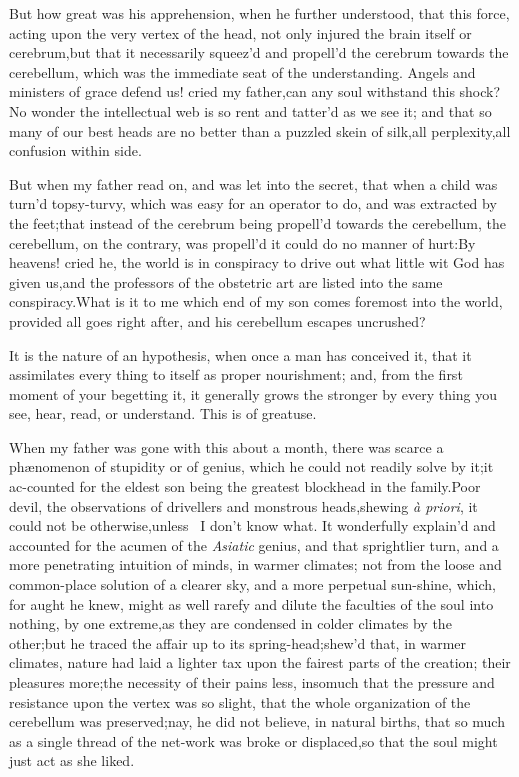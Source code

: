 \documentclass{article}
\begin{document}
But how great was his apprehension, when he further understood,
that this force, acting upon the very vertex of the head, not only
injured the brain itself or cerebrum,\tsk but that it
necessarily squeez’d and propell’d the cerebrum towards the
cerebellum, which was the immediate seat of the
understanding.\tsh\break
Angels and ministers of grace defend
us! cried my father,\tsk can any soul withstand this
shock?\tsk No wonder the intellectual web is so rent and tatter’d
as we see it; and that so many of our best heads are no better than
a puzzled skein of silk,\tsk all
perplexity,\tsk all confusion within side.

But when my father read on, and was let into the secret, that
when a child was turn’d topsy-turvy, which was easy for an operator
to do, and was extracted by the feet;\tsk that instead of the
cerebrum being propell’d towards the cerebellum, the cerebellum, on
the contrary, was propell’d  it could
do no manner of hurt:\tsh By heavens! cried he, the world
is in conspiracy to drive out what little wit God has given
us,\tsk and the professors of the obstetric art are listed
into the same conspiracy.\tsk What is it to me which end of my
son comes foremost into the world, provided all goes right after,
and his cerebellum escapes uncrushed?

It is the nature of an hypothesis, when once a man has conceived
it, that it assimilates every thing to itself as proper
nourishment; and, from the first moment of your begetting it, it
generally grows the stronger by every thing you see, hear, read, or
understand. This is of great\break use.

When my father was gone with this about a month, there was
scarce a phæ\-nomenon of stupidity or of genius, which he could
not readily solve by it;\tsk it ac-\break counted for the eldest son
being the greatest blockhead in the family.\tsk Poor
devil, 
the observations of drivellers and monstrous heads,\tsk shewing \textit{à
priori}, it could not be otherwise,\tsk unless \astiv\ I
don’t know what. It wonderfully explain’d and accounted for
the acumen of the \textit{Asiatic} genius, and that sprightlier turn,
and a more penetrating intuition of minds, in warmer climates; not
from the loose and common-place solution of a clearer sky, and a
more perpetual sun-shine, \etc\tsk\break which, for aught he knew,
might as well rarefy and dilute the faculties of the soul into
nothing, by one extreme,\tsk as they
are condensed in colder climates by the other;\tsh but he traced the affair up to
its spring-head;\tsk shew’d that, in warmer climates, nature had laid a lighter tax
upon the fairest parts of the creation;\tsk\break
their pleasures more;\tsk the necessity of their pains less, insomuch that the
pressure and resistance upon the vertex was so slight, that the whole organization
of the cerebellum was preserved;\tsh nay, he did not believe, in natural births,
that so much as a single thread of the net-work was broke or displaced,\tsh so that
the soul might just act as she liked.
\end{document}
